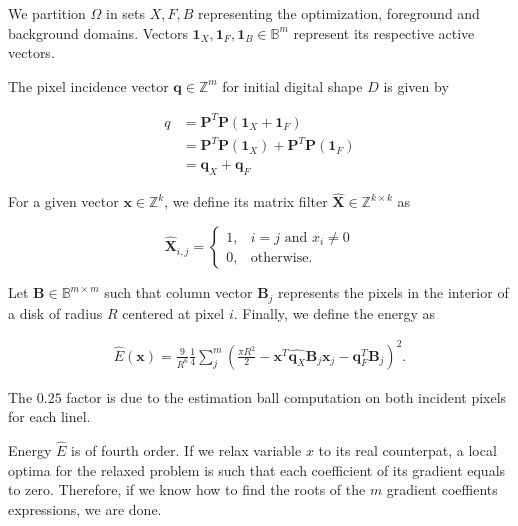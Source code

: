 We partition $\Omega$ in sets $X,F,B$ representing the optimization, foreground and background domains. Vectors $\mathbf{1}_X, \mathbf{1}_F, \mathbf{1}_B \in \mathbb{B}^m$ represent its respective active vectors.

\begin{example}
	The pixel incidence vector $\mathbf{q} \in \mathbb{Z}^m$ for initial digital shape $D$ is given by
	
	\begin{align*}
		q &= \mathbf{P}^T\mathbf{P} (\mathbf{1}_X + \mathbf{1}_F)\\
		&=\mathbf{P}^T\mathbf{P} (\mathbf{1}_X) + \mathbf{P}^T\mathbf{P} (\mathbf{1}_F)\\ 
		&= \mathbf{q}_X + \mathbf{q}_F
	\end{align*}
\end{example}

For a given vector $\mathbf{x} \in \mathbb{Z}^k$, we define its matrix filter $\hat{\mathbf{X}} \in \mathbb{Z}^{k\times k}$ as

\[
	\hat{\mathbf{X}}_{i,j} = \left\{ \begin{array}{ll}
	1, & i=j \text{ and } x_i \neq 0 \\
	0, & \text{otherwise}.
	\end{array}\right.
\]

Let $\mathbf{B} \in \mathbb{B}^{m\times m}$ such that column vector $\mathbf{B}_j$ represents the pixels in the interior of a disk of radius $R$ centered at pixel $i$. Finally, we define the energy as

\begin{align*}
	\hat{E}(\mathbf{x}) = \frac{9}{R^6}\frac{1}{4}\sum_{j}^{m}{\left( \frac{\pi R^2}{2} - \mathbf{x}^T\hat{\mathbf{q}_X}\mathbf{B}_j\mathbf{x}_j - \mathbf{q}_F^T\mathbf{B}_j \right)^2}.
\end{align*}

The $0.25$ factor is due to the estimation ball computation on both incident pixels for each linel. 

Energy $\hat{E}$ is of fourth order. If we relax variable $x$ to its real counterpat, a local optima for the relaxed problem is such that each coefficient of its gradient equals to zero. Therefore, if we know how to find the roots of the $m$ gradient coeffients expressions, we are done.

%
